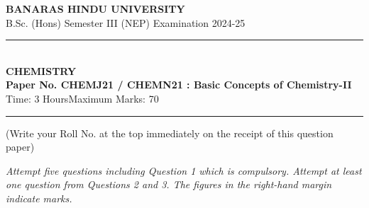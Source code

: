 \documentclass[11pt,a4paper]{article}
\begin{document}
\begin{center}
  {\large\bfseries BANARAS HINDU UNIVERSITY}\\[2pt]
  {\normalsize B.Sc. (Hons) Semester III (NEP) Examination 2024-25}\\[6pt]
  \rule{0.8\linewidth}{0.5pt}\\[6pt]
  {\large\bfseries CHEMISTRY}\\[4pt]
  {\large\bfseries Paper No. CHEMJ21 / CHEMN21 : Basic Concepts of Chemistry-II}\\[4pt]
  {\normalsize Time: 3 Hours\hfill Maximum Marks: 70}
\end{center}

\rule{\linewidth}{0.4pt}

\smallskip



\noindent (Write your Roll No. at the top immediately on the receipt of this question paper)

\smallskip



\noindent   \textit{Attempt five questions including Question 1 which is compulsory. Attempt at least one question from Questions 2 and 3. The figures in the right-hand margin indicate marks.}

\bigskip
\end{document}
